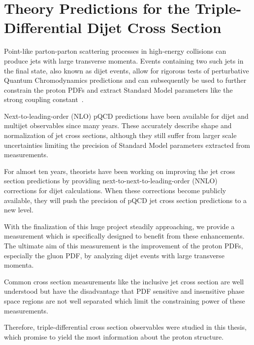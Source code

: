 
\chapter{Theory Predictions for the Triple-Differential Dijet Cross Section}
\label{sec:theory_predictions}

Point-like parton-parton scattering processes in high-energy collisions can
produce jets with large transverse momenta. Events containing two such jets in
the final state, also known as dijet events, allow for rigorous tests of
perturbative Quantum Chromodynamics predictions and can subsequently be used to
further constrain the proton PDFs and extract Standard Model parameters like the
strong coupling constant~\as.

Next-to-leading-order (NLO) pQCD predictions have been available for dijet and
multijet observables since many years. These accurately describe shape and
normalization of jet cross sections, although they still suffer from larger
scale uncertainties limiting the precision of Standard Model parameters
extracted from measurements.

For almost ten years, theorists have been working on improving the jet cross
section predictions by providing next-to-next-to-leading-order (NNLO)
corrections for dijet calculations. When these corrections become publicly
available, they will push the precision of pQCD jet cross section predictions to
a new level.

With the finalization of this huge project steadily approaching, we provide a
measurement which is specifically designed to benefit from these enhancements.
The ultimate aim of this measurement is the improvement of the proton PDFs,
especially the gluon PDF, by analyzing dijet events with large transverse
momenta.

Common cross section measurements like the inclusive jet cross section are well
understood but have the disadvantage that PDF sensitive and insensitive phase
space regions are not well separated which limit the constraining power of these
measurements.

Therefore, triple-differential cross section observables were studied in this
thesis, which promise to yield the most information about the proton structure.


